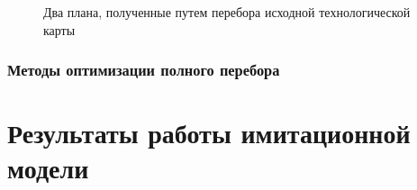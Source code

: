 \begin{figure}[H]
    \caption{Два плана, полученные путем перебора исходной технологической карты}
    \label{ris:Force}
\end{figure}

\subsubsection{Методы оптимизации полного перебора}

\section{Результаты работы имитационной модели}